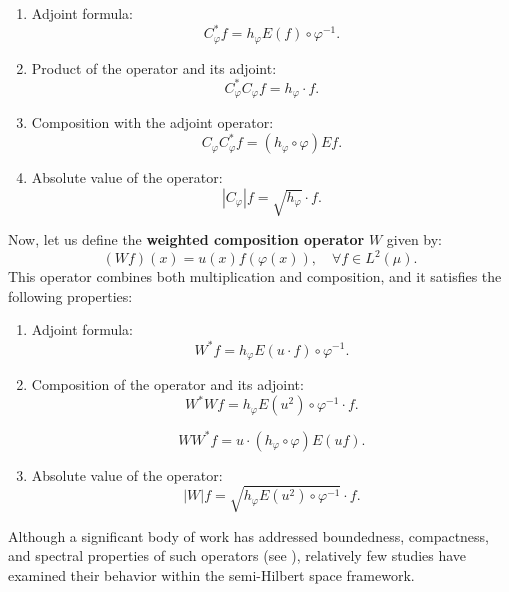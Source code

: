 \documentclass{amsart}
\theoremstyle{definition}\newtheorem{defn}[thm]{Definition}
\theoremstyle{remark}
\numberwithin{equation}{section}
\begin{document}
\begin{enumerate}
    \item {Adjoint formula:}
    \begin{equation*}
        C_\varphi^* f = h_\varphi E(f) \circ \varphi^{-1}.
    \end{equation*}
    \item {Product of the operator and its adjoint:}
    \begin{equation*}
        C_\varphi^* C_\varphi f = h_\varphi \cdot f.
    \end{equation*}
    \item {Composition with the adjoint operator:}
    \begin{equation*}
        C_\varphi C_\varphi^* f = (h_\varphi \circ \varphi) E f.
    \end{equation*}
    \item {Absolute value of the operator:}
    \begin{equation*}
        |C_\varphi| f = \sqrt{h_\varphi } \cdot f.
    \end{equation*}
\end{enumerate}


Now, let us define the \textbf{weighted composition operator} $W$ given by:
\begin{equation}
    (W f)(x) = u(x) f(\varphi(x)), \quad \forall f \in L^2(\mu).
\end{equation}
This operator combines both multiplication and composition, and it satisfies the following properties:

\begin{enumerate}
    \item {Adjoint formula:}
    \begin{equation*}
        W^* f = h_\varphi E(u \cdot f) \circ \varphi^{-1}.
    \end{equation*}
    \item {Composition of the operator and its adjoint:}
    \begin{equation*}
        W^* W f = h_\varphi E(u^2) \circ \varphi^{-1} \cdot f.
    \end{equation*}
    
    \begin{equation*}
        WW^* f = u \cdot (h_\varphi \circ \varphi) E(uf).
    \end{equation*}
    \item {Absolute value of the operator:}
    \begin{equation*}
        |W| f = \sqrt{h_\varphi E(u^2)\circ \varphi^{-1}}  \cdot f.
    \end{equation*}
\end{enumerate}
Although a significant body of work has addressed boundedness, compactness, and spectral properties of such operators (see \cite{Cowen1995, ManhasGhafri2024, Estaremi2024,  AlGhafri2020a, AlGhafri2021}), relatively few studies have examined their behavior within the semi-Hilbert space framework.
\end{document}
